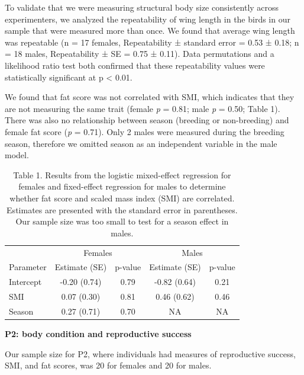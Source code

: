 \documentclass[
]{article}
\begin{document}
To validate that we were measuring structural body size consistently
across experimenters, we analyzed the repeatability of wing length in
the birds in our sample that were measured more than once. We found that
average wing length was repeatable (n = 17 females, Repeatability ±
standard error = 0.53 ± 0.18; n = 18 males, Repeatability ± SE = 0.75 ±
0.11). Data permutations and a likelihood ratio test both confirmed that
these repeatability values were statistically significant at p
\textless{} 0.01.

We found that fat score was not correlated with SMI, which indicates
that they are not measuring the same trait (female \emph{p} = 0.81; male
\emph{p} = 0.50; Table 1). There was also no relationship between season
(breeding or non-breeding) and female fat score (\emph{p} = 0.71). Only
2 males were measured during the breeding season, therefore we omitted
season as an independent variable in the male model.

\begin{table}

\caption{\label{tab:p1 results}Table 1. Results from the logistic mixed-effect regression for females and fixed-effect regression for males to determine whether fat score and scaled mass index (SMI) are correlated. Estimates are presented with the standard error in parentheses. Our sample size was too small to test for a season effect in males.}
\centering
\begin{tabular}[t]{l|c|c|c|c}
\hline
\multicolumn{1}{c|}{ } & \multicolumn{2}{c|}{Females} & \multicolumn{2}{c}{Males} \\
\cline{2-3} \cline{4-5}
Parameter & Estimate (SE) & p-value & Estimate (SE) & p-value\\
\hline
Intercept & -0.20 (0.74) & 0.79 & -0.82 (0.64) & 0.21\\
\hline
SMI & 0.07 (0.30) & 0.81 & 0.46 (0.62) & 0.46\\
\hline
Season & 0.27 (0.71) & 0.70 & NA & NA\\
\hline
\end{tabular}
\end{table}

\textbf{P2: body condition and reproductive success}

Our sample size for P2, where individuals had measures of reproductive
success, SMI, and fat scores, was 20 for females and 20 for males.
\end{document}
